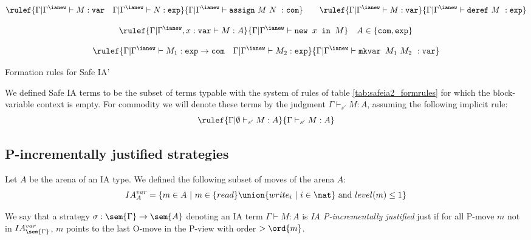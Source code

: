 \begin{table}[htbp]
$$ \rulef{\Gamma| \Gamma^{\ianew} \vdash M : \texttt{var} \quad \Gamma| \Gamma^{\ianew} \vdash N : \texttt{exp}}
    {\Gamma| \Gamma^{\ianew} \vdash \texttt{assign}\ M\ N\ : \texttt{com}}
\qquad
 \rulef{\Gamma| \Gamma^{\ianew} \vdash M : \texttt{var}}
    {\Gamma| \Gamma^{\ianew} \vdash \texttt{deref}\ M\ : \texttt{exp}}$$

$$ \rulef{\Gamma | \Gamma^{\ianew}, x : \texttt{var} \vdash M : A}
    {\Gamma | \Gamma^{\ianew} \vdash \texttt{new } x \texttt{ in } M} \quad A \in \{ \texttt{com}, \texttt{exp}\}$$

$$ \rulef{\Gamma| \Gamma^{\ianew} \vdash M_1 : \texttt{exp} \rightarrow \texttt{com} \quad \Gamma| \Gamma^{\ianew} \vdash M_2 : \texttt{exp}}
    {\Gamma| \Gamma^{\ianew} \vdash \texttt{mkvar } M_1\ M_2\ : \texttt{var}}$$


\caption{Formation rules for Safe IA'} \label{tab:safeia2_formrules}
\end{table}

 We defined Safe IA terms to be the subset of terms typable with
the system of rules of table \ref{tab:safeia2_formrules} for which
the block-variable context is empty. For commodity we will denote
these terms by the judgment $\Gamma \vdash_{s'} M : A$, assuming the
following implicit rule:
$$ \rulef{\Gamma | \emptyset \vdash_{s'} M : A} {\Gamma \vdash_{s'} M : A}$$

\subsection{P-incrementally justified strategies}

Let $A$ be the arena of an IA type. We defined the following subset
of moves of the arena $A$:
$$ IA^{var}_{A} =\{ m \in A \ | \ m \in \{ read \} \union \{ write_i \ | \ i \in \nat \} \mbox{ and } level(m) \leq 1 \} $$



We say that a strategy $\sigma : \sem{\Gamma} \rightarrow \sem{A}$
denoting an IA term $\Gamma \vdash M :A$ is \emph{IA P-incrementally
justified} just if for all P-move $m$ not in
$IA^{var}_{\sem{\Gamma}}$, $m$ points to the last O-move in the
P-view with order $> \ord{m}$.






